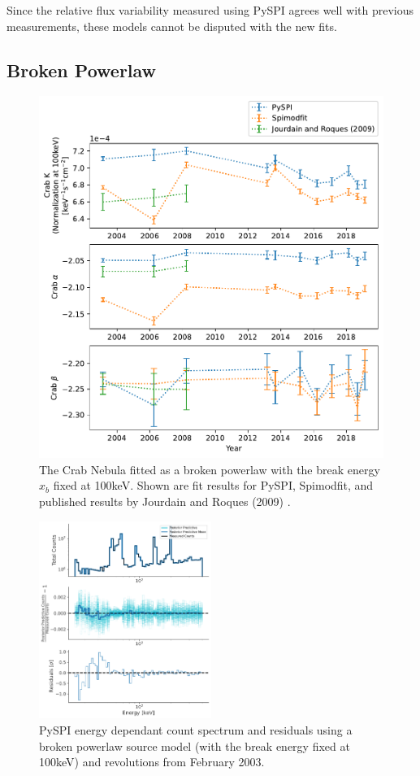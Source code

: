\documentclass{report}
\begin{document}
Since the relative flux variability measured using PySPI agrees well with previous measurements, these models cannot be disputed with the new fits.



\FloatBarrier

\subsection{Broken Powerlaw}

\begin{figure}[H]
  \centering
  \includegraphics[width=.65\textwidth]{Images/Crab_Fits/crab_brk_pl_100.pdf}
  \caption{The Crab Nebula fitted as a broken powerlaw with the break energy $x_b$ fixed at 100keV. Shown are fit results for PySPI, Spimodfit, and published results by Jourdain and Roques (2009) \cite{2009ApJ...704...17J}.}
  \label{fig crab br pl}
\end{figure}

\begin{figure}[h]
  \centering
  \includegraphics[width=0.5\textwidth]{Images/Crab_Fits/energy_residual_plot_br_pl_100.pdf}
  \caption{PySPI energy dependant count spectrum and residuals using a broken powerlaw source model (with the break energy fixed at 100keV) and revolutions from February 2003.}
  \label{fig res br pl}
\end{figure}
\end{document}

